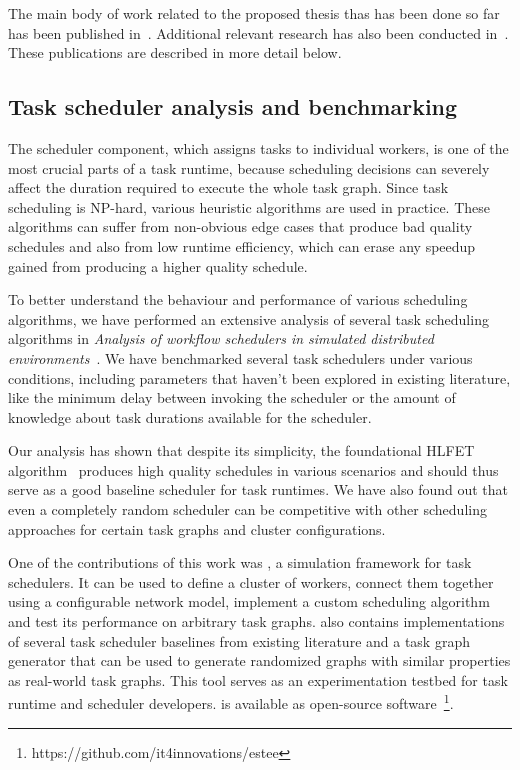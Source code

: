 The main body of work related to the proposed thesis thas has been done so far has been published
in~\cite{estee, rsds}. Additional relevant research has also been conducted
in~\cite{spin2,spin}. These publications are described in more detail below.

\subsection{Task scheduler analysis and benchmarking}
The scheduler component, which assigns tasks to individual workers, is one of the
most crucial parts of a task runtime, because scheduling decisions can severely affect the
duration required to execute the whole task graph. Since task scheduling is NP-hard, various
heuristic algorithms are used in practice. These algorithms can suffer from non-obvious edge cases
that produce bad quality schedules and also from low runtime efficiency, which can erase any
speedup gained from producing a higher quality schedule.

To better understand the behaviour and performance of various scheduling algorithms, we have
performed an extensive analysis of several task scheduling algorithms in
\emph{Analysis of workflow schedulers in simulated distributed environments}~\cite{estee}.
We have benchmarked several task schedulers under various conditions, including parameters that
haven't been explored in existing literature, like the minimum delay between invoking the scheduler
or the amount of knowledge about task durations available for the scheduler.

Our analysis has shown that despite its simplicity, the foundational HLFET
algorithm~\cite{hlfet1974} produces high quality schedules in various scenarios and should thus
serve as a good baseline scheduler for task runtimes. We have also found out that even a
completely random scheduler can be competitive with other scheduling approaches for certain task
graphs and cluster configurations.

One of the contributions of this work was \estee{}, a simulation framework for task
schedulers. It can be used to define a cluster of workers, connect them together using a
configurable network model, implement a custom scheduling algorithm and test its performance on
arbitrary task graphs. \estee{} also contains implementations of several task scheduler
baselines from existing literature and a task graph generator that can be used to generate
randomized graphs with similar properties as real-world task graphs. This tool serves as an
experimentation testbed for task runtime and scheduler developers. \estee{} is
available as open-source software~\footnote{https://github.com/it4innovations/estee}.

